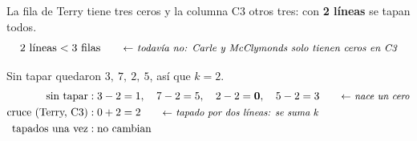 \documentclass[11pt,a4paper]{article}
\newcommand{\marco}[3]{%
  \foreach \i in {2,...,#2} \foreach \j in {2,...,#3}
    \draw[gray!60, very thin] (#1-\i-\j.north west) rectangle (#1-\i-\j.south east);
  \draw[semithick] (#1-2-2.north west) rectangle (#1-#2-#3.south east);}
\newcommand{\tfila}[3]{\draw[tapa] (#1-#2-2.west) -- (#1-#2-#3.east);}
\newcommand{\tcol}[3]{\draw[tapa] (#1-2-#2.north) -- (#1-#3-#2.south);}
\newcommand{\pie}[2]{\node[below=1.5mm of #1, font=\scriptsize\itshape] {#2};}
\newcommand{\flecha}[3]{\draw[-{Stealth[length=2.4mm]}, thick] (#1.east) -- node[above, font=\scriptsize, align=center] {#3} (#1.east -| #2.west);}
\begin{document}
\begin{center}
\end{center}
La fila de Terry tiene tres ceros y la columna C3 otros tres: con \textbf{2 líneas} se tapan todos.
\[
2 \text{ líneas} < 3 \text{ filas} \nota{todavía no: Carle y McClymonds solo tienen ceros en C3}
\]

Sin tapar quedaron $3,\ 7,\ 2,\ 5$, así que $k = 2$.
\begin{align*}
\text{sin tapar} &: 3 - 2 = 1,\quad 7 - 2 = 5,\quad 2 - 2 = \mathbf{0},\quad 5 - 2 = 3 \nota{nace un cero}\\
\text{cruce (Terry, C3)} &: 0 + 2 = 2 \nota{tapado por dos líneas: se suma $k$}\\
\text{tapados una vez} &: \text{no cambian}
\end{align*}
\end{document}

